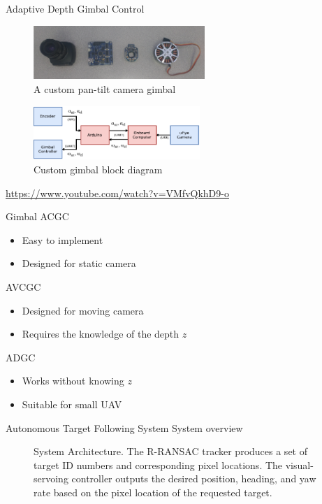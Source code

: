 \documentclass[9pt]{beamer}
\begin{document}
\begin{frame}{Adaptive Depth Gimbal Control}
\begin{figure}[htbp]
	\centering
	\includegraphics[height=0.8in]{chapter2/gimbal_parts.png}
	\caption{A custom pan-tilt camera gimbal}
	\label{gimbal_parts}
\end{figure}
\begin{figure}[htbp]
	\centering
	\includegraphics[height=0.8in]{chapter2/gimbal_system_blockdiagram}
	\caption{Custom gimbal block diagram}
	\label{gimbal_blockdiagram}
\end{figure}	
\href{https://www.youtube.com/watch?v=VMfvQkhD9-o}{https://www.youtube.com/watch?v=VMfvQkhD9-o}
\end{frame}

\begin{frame}{Gimbal}
ACGC
\begin{itemize}
	\item Easy to implement
	\item Designed for static camera
\end{itemize}
AVCGC
\begin{itemize}
	\item Designed for moving camera
	\item Requires the knowledge of the depth $z$
\end{itemize}
ADGC
\begin{itemize}
	\item Works without knowing $z$
	\item Suitable for small UAV
\end{itemize}
\end{frame}

\begin{frame}{Autonomous Target Following System}
System overview
\begin{figure}[htbp]
	\centering
	\caption{System Architecture. The R-RANSAC tracker produces a set of target ID numbers and corresponding pixel locations. The visual-servoing controller outputs the desired position, heading, and yaw rate based on the pixel location of the requested target.}
	\label{system}
\end{figure}
\end{frame}
\end{document}
